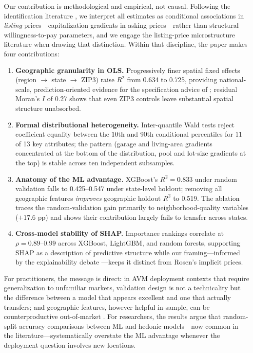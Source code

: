 Our contribution is methodological and empirical, not causal. Following the
identification literature \citep{bartik1987estimation, ekeland2004identification,
kuminoff2013new, bishop2020best}, we interpret all estimates as conditional
associations in \emph{listing} prices---capitalization gradients in asking
prices---rather than structural willingness-to-pay parameters, and we engage the
listing-price microstructure literature \citep{horowitz1992role, genesove2001loss,
han2016role} when drawing that distinction. Within that discipline, the paper
makes four contributions:

\begin{enumerate}[nosep]
    \item \textbf{Geographic granularity in OLS.} Progressively finer spatial
    fixed effects (region $\rightarrow$ state $\rightarrow$ ZIP3) raise $R^2$ from
    0.634 to 0.725, providing national-scale, prediction-oriented evidence for the
    specification advice of \citet{kuminoff2010which}; residual Moran's $I$ of
    0.27 shows that even ZIP3 controls leave substantial spatial structure
    unabsorbed.
    \item \textbf{Formal distributional heterogeneity.} Inter-quantile Wald tests
    reject coefficient equality between the 10th and 90th conditional percentiles
    for 11 of 13 key attributes; the pattern (garage and living-area gradients
    concentrated at the bottom of the distribution, pool and lot-size gradients at
    the top) is stable across ten independent subsamples.
    \item \textbf{Anatomy of the ML advantage.} XGBoost's $R^2 = 0.833$ under
    random validation falls to 0.425--0.547 under state-level holdout; removing
    all geographic features \emph{improves} geographic holdout $R^2$ to 0.519.
    The ablation traces the random-validation gain primarily to
    neighborhood-quality variables ($+17.6$ pp) and shows their contribution
    largely fails to transfer across states.
    \item \textbf{Cross-model stability of SHAP.} Importance rankings correlate at
    $\rho = 0.89$--$0.99$ across XGBoost, LightGBM, and random forests, supporting
    SHAP as a description of predictive structure while our framing---informed by
    the explainability debate \citep{rudin2019stop}---keeps it distinct from
    Rosen's implicit prices.
\end{enumerate}

For practitioners, the message is direct: in AVM deployment contexts that require
generalization to unfamiliar markets, validation design is not a technicality but
the difference between a model that appears excellent and one that actually
transfers; and geographic features, however helpful in-sample, can be
counterproductive out-of-market \citep{steurer2021metrics}. For researchers, the
results argue that random-split accuracy comparisons between ML and hedonic
models---now common in the literature---systematically overstate the ML advantage
whenever the deployment question involves new locations.

